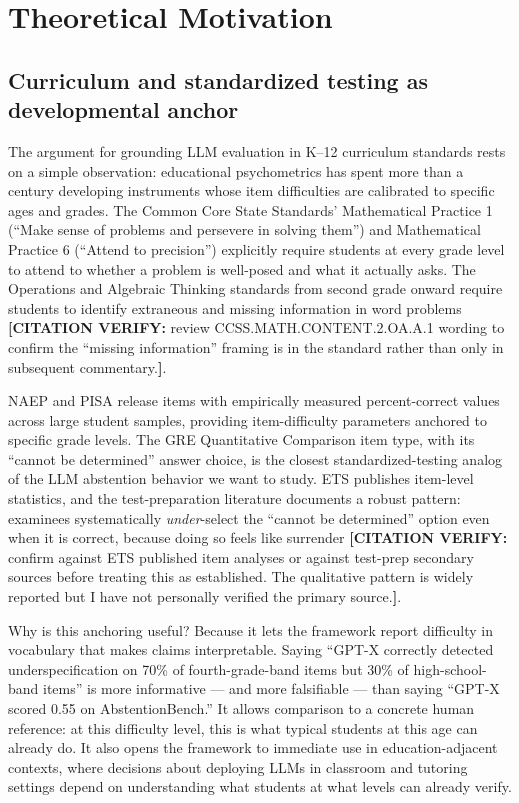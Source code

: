 \documentclass[11pt,letterpaper]{article}
\newcommand{\citeverify}[1]{{\color{orange}\textbf{[CITATION VERIFY:} #1\textbf{]}}}
\begin{document}
\section{Theoretical Motivation}

\subsection{Curriculum and standardized testing as developmental anchor}

The argument for grounding LLM evaluation in K--12 curriculum standards rests on a simple observation: educational psychometrics has spent more than a century developing instruments whose item difficulties are calibrated to specific ages and grades. The Common Core State Standards' Mathematical Practice 1 (``Make sense of problems and persevere in solving them'') and Mathematical Practice 6 (``Attend to precision'') explicitly require students at every grade level to attend to whether a problem is well-posed and what it actually asks. The Operations and Algebraic Thinking standards from second grade onward require students to identify extraneous and missing information in word problems \citeverify{review CCSS.MATH.CONTENT.2.OA.A.1 wording to confirm the ``missing information'' framing is in the standard rather than only in subsequent commentary.}.

NAEP and PISA release items with empirically measured percent-correct values across large student samples, providing item-difficulty parameters anchored to specific grade levels. The GRE Quantitative Comparison item type, with its ``cannot be determined'' answer choice, is the closest standardized-testing analog of the LLM abstention behavior we want to study. ETS publishes item-level statistics, and the test-preparation literature documents a robust pattern: examinees systematically \emph{under}-select the ``cannot be determined'' option even when it is correct, because doing so feels like surrender \citeverify{confirm against ETS published item analyses or against test-prep secondary sources before treating this as established. The qualitative pattern is widely reported but I have not personally verified the primary source.}.

Why is this anchoring useful? Because it lets the framework report difficulty in vocabulary that makes claims interpretable. Saying ``GPT-X correctly detected underspecification on 70\% of fourth-grade-band items but 30\% of high-school-band items'' is more informative --- and more falsifiable --- than saying ``GPT-X scored 0.55 on AbstentionBench.'' It allows comparison to a concrete human reference: at this difficulty level, this is what typical students at this age can already do. It also opens the framework to immediate use in education-adjacent contexts, where decisions about deploying LLMs in classroom and tutoring settings depend on understanding what students at what levels can already verify.
\end{document}
